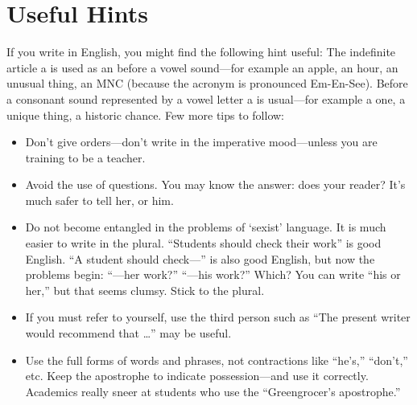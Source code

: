 \chapter{Useful Hints}
\label{chap:six}

If you write in English, you might find the following hint
useful: The indefinite article a is used as an before a
vowel sound---for example an apple, an hour, an unusual
thing, an \ac{MNC} (because the acronym is pronounced Em-En-See). Before a consonant sound represented
by a vowel letter a is usual---for example a one, a
unique thing, a historic chance. Few more tips to follow:


\begin{itemize}
\item Don't give orders---don't write in the imperative mood---unless you are training to be a teacher.
\item Avoid the use of questions. You may know the answer: does your reader? It's much safer to tell her, or him.
\item Do not become entangled in the problems of `sexist' language. It is much easier to write in the plural. ``Students should check their work'' is good English. ``A student should check---'' is also good English, but now the problems begin: ``---her work?'' ``---his work?'' Which? You can write ``his or her,'' but that seems clumsy. Stick to the plural.
\item If you must refer to yourself, use the third person such as ``The present writer would recommend that \ldots'' may be useful.
\item Use the full forms of words and phrases, not contractions like ``he's,'' ``don't,'' etc. Keep the apostrophe to indicate possession---and use it correctly. Academics really sneer at students who use the ``Greengrocer's apostrophe.''
\end{itemize}


